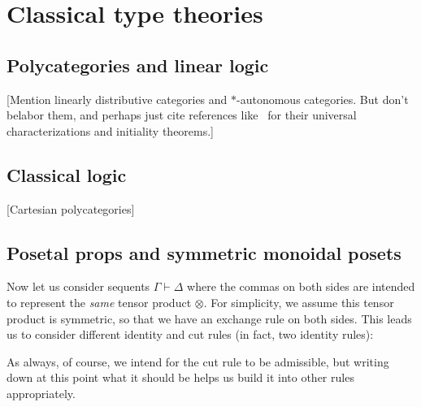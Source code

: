\documentclass{book}
\let\types\vdash
\let\tensor\otimes
\begin{document}
\chapter{Classical type theories}
\label{chap:polycats}



\section{Polycategories and linear logic}
\label{sec:cllin}

[Mention linearly distributive categories and $\ast$-autonomous categories.
But don't belabor them, and perhaps just cite references like~\cite{cs:wkdistrib} for their universal characterizations and initiality theorems.]


\section{Classical logic}
\label{sec:classical}

[Cartesian polycategories]


\section{Posetal props and symmetric monoidal posets}
\label{sec:proppos-smpos}

Now let us consider sequents $\Gamma\types\Delta$ where the commas on both sides are intended to represent the \emph{same} tensor product $\tensor$.
For simplicity, we assume this tensor product is symmetric, so that we have an exchange rule on both sides.
This leads us to consider different identity and cut rules (in fact, two identity rules):
As always, of course, we intend for the cut rule to be admissible, but writing down at this point what it should be helps us build it into other rules appropriately.
\end{document}

